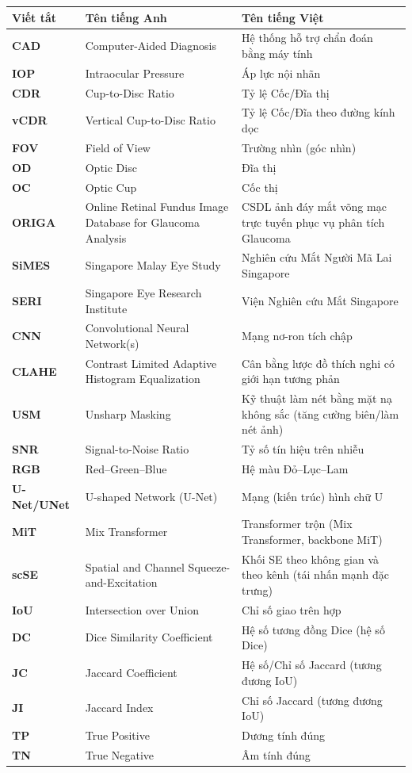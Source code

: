 \documentclass[../DoAn.tex]{subfiles}
\begin{document}
\begingroup
\captionsetup{list=no} %
\begin{center}

\begin{tabular}{l  p{6cm} p{7cm}}
\hline
\textbf{Viết tắt}  & \textbf{Tên tiếng Anh} & \textbf{Tên tiếng Việt} \\ \hline

\textbf{CAD} & Computer-Aided Diagnosis & Hệ thống hỗ trợ chẩn đoán bằng máy tính \\
\textbf{IOP} & Intraocular Pressure & Áp lực nội nhãn \\
\textbf{CDR} & Cup-to-Disc Ratio & Tỷ lệ Cốc/Đĩa thị \\
\textbf{vCDR} & Vertical Cup-to-Disc Ratio & Tỷ lệ Cốc/Đĩa theo đường kính dọc \\
\textbf{FOV} & Field of View & Trường nhìn (góc nhìn) \\
\textbf{OD} & Optic Disc & Đĩa thị \\
\textbf{OC} & Optic Cup & Cốc thị \\
\textbf{ORIGA} & Online Retinal Fundus Image Database for Glaucoma Analysis & CSDL ảnh đáy mắt võng mạc trực tuyến phục vụ phân tích Glaucoma \\
\textbf{SiMES} & Singapore Malay Eye Study & Nghiên cứu Mắt Người Mã Lai Singapore \\
\textbf{SERI} & Singapore Eye Research Institute & Viện Nghiên cứu Mắt Singapore \\
\textbf{CNN} & Convolutional Neural Network(s) & Mạng nơ-ron tích chập \\
\textbf{CLAHE} & Contrast Limited Adaptive Histogram Equalization & Cân bằng lược đồ thích nghi có giới hạn tương phản \\
\textbf{USM} & Unsharp Masking & Kỹ thuật làm nét bằng mặt nạ không sắc (tăng cường biên/làm nét ảnh) \\
\textbf{SNR} & Signal-to-Noise Ratio & Tỷ số tín hiệu trên nhiễu \\
\textbf{RGB} & Red–Green–Blue & Hệ màu Đỏ–Lục–Lam \\
\textbf{U-Net/UNet} & U-shaped Network (U-Net) & Mạng (kiến trúc) hình chữ U \\
\textbf{MiT} & Mix Transformer & Transformer trộn (Mix Transformer, backbone MiT) \\
\textbf{scSE} & Spatial and Channel Squeeze-and-Excitation & Khối SE theo không gian và theo kênh (tái nhấn mạnh đặc trưng) \\
\textbf{IoU} & Intersection over Union & Chỉ số giao trên hợp \\
\textbf{DC} & Dice Similarity Coefficient & Hệ số tương đồng Dice (hệ số Dice) \\
\textbf{JC} & Jaccard Coefficient & Hệ số/Chỉ số Jaccard (tương đương IoU) \\
\textbf{JI} & Jaccard Index & Chỉ số Jaccard (tương đương IoU) \\
\textbf{TP} & True Positive & Dương tính đúng \\
\textbf{TN} & True Negative & Âm tính đúng \\
\hline


\end{tabular}
\end{center}
\end{document}
